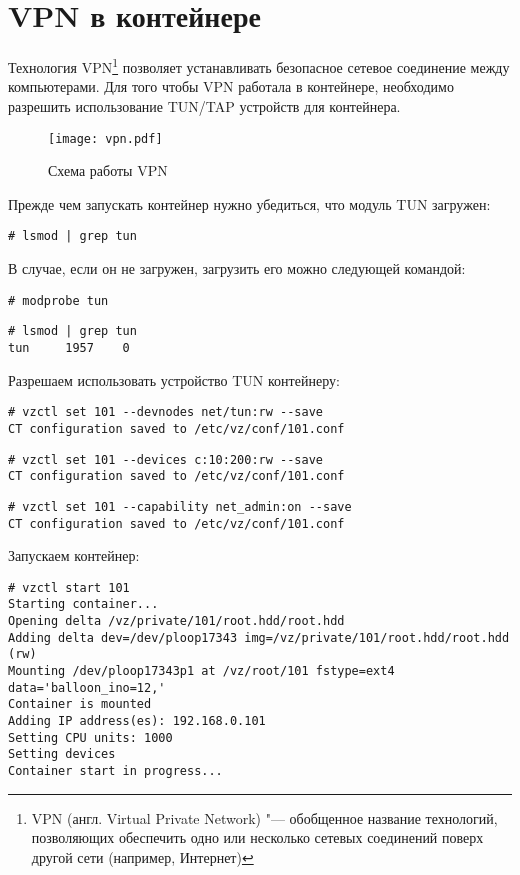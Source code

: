 \section{VPN в контейнере}

Технология VPN\footnote{VPN (англ. Virtual Private Network) "--- обобщенное название технологий, позволяющих обеспечить одно или несколько сетевых соединений поверх другой сети (например, Интернет)} позволяет устанавливать безопасное сетевое соединение между компьютерами.
Для того чтобы VPN работала в контейнере, необходимо разрешить использование TUN/TAP устройств для контейнера.
\begin{figure}[ht]
    \centering
	\texttt{[image: vpn.pdf]}
	\caption{Схема работы VPN}\label{pic:vpn}
\end{figure}

Прежде чем запускать контейнер нужно убедиться, что модуль TUN загружен:
\begin{lstlisting}
# lsmod | grep tun
\end{lstlisting}

В случае, если он не загружен, загрузить его можно следующей командой:
\begin{lstlisting}
# modprobe tun
\end{lstlisting}
\begin{lstlisting}
# lsmod | grep tun
tun     1957    0
\end{lstlisting}

Разрешаем использовать устройство TUN контейнеру:
\begin{lstlisting}
# vzctl set 101 --devnodes net/tun:rw --save
CT configuration saved to /etc/vz/conf/101.conf
\end{lstlisting}
\begin{lstlisting}
# vzctl set 101 --devices c:10:200:rw --save
CT configuration saved to /etc/vz/conf/101.conf
\end{lstlisting}
\begin{lstlisting}
# vzctl set 101 --capability net_admin:on --save
CT configuration saved to /etc/vz/conf/101.conf
\end{lstlisting}

Запускаем контейнер:
\begin{lstlisting}
# vzctl start 101
Starting container...
Opening delta /vz/private/101/root.hdd/root.hdd
Adding delta dev=/dev/ploop17343 img=/vz/private/101/root.hdd/root.hdd (rw)
Mounting /dev/ploop17343p1 at /vz/root/101 fstype=ext4 data='balloon_ino=12,' 
Container is mounted
Adding IP address(es): 192.168.0.101
Setting CPU units: 1000
Setting devices
Container start in progress...
\end{lstlisting}

